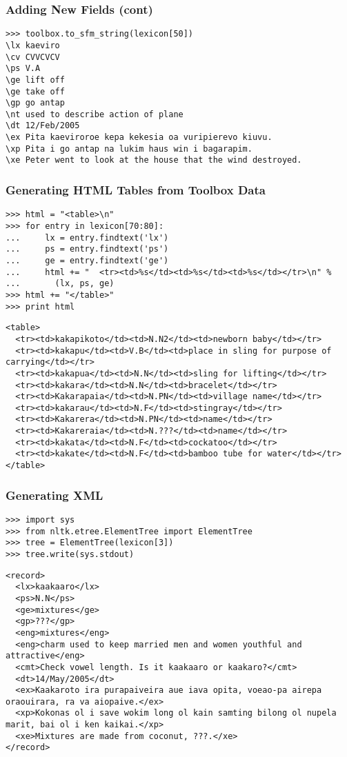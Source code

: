 \documentclass{beamer}             %
\begin{document}
\begin{frame}[fragile]
\frametitle{Adding New Fields (cont)}
\scriptsize
\begin{verbatim}
>>> toolbox.to_sfm_string(lexicon[50])
\lx kaeviro
\cv CVVCVCV
\ps V.A
\ge lift off
\ge take off
\gp go antap
\nt used to describe action of plane
\dt 12/Feb/2005
\ex Pita kaeviroroe kepa kekesia oa vuripierevo kiuvu.
\xp Pita i go antap na lukim haus win i bagarapim.
\xe Peter went to look at the house that the wind destroyed.
\end{verbatim}
\end{frame}

\begin{frame}[fragile]
\frametitle{Generating HTML Tables from Toolbox Data}

\scriptsize
\begin{verbatim}
>>> html = "<table>\n"
>>> for entry in lexicon[70:80]:
...     lx = entry.findtext('lx')
...     ps = entry.findtext('ps')
...     ge = entry.findtext('ge')
...     html += "  <tr><td>%s</td><td>%s</td><td>%s</td></tr>\n" %
...       (lx, ps, ge)
>>> html += "</table>"
>>> print html
\end{verbatim}

\tiny

\begin{verbatim}
<table>
  <tr><td>kakapikoto</td><td>N.N2</td><td>newborn baby</td></tr>
  <tr><td>kakapu</td><td>V.B</td><td>place in sling for purpose of carrying</td></tr>
  <tr><td>kakapua</td><td>N.N</td><td>sling for lifting</td></tr>
  <tr><td>kakara</td><td>N.N</td><td>bracelet</td></tr>
  <tr><td>Kakarapaia</td><td>N.PN</td><td>village name</td></tr>
  <tr><td>kakarau</td><td>N.F</td><td>stingray</td></tr>
  <tr><td>Kakarera</td><td>N.PN</td><td>name</td></tr>
  <tr><td>Kakareraia</td><td>N.???</td><td>name</td></tr>
  <tr><td>kakata</td><td>N.F</td><td>cockatoo</td></tr>
  <tr><td>kakate</td><td>N.F</td><td>bamboo tube for water</td></tr>
</table>
\end{verbatim}
\end{frame}

\begin{frame}[fragile]
\frametitle{Generating XML}

\small
\begin{verbatim}
>>> import sys
>>> from nltk.etree.ElementTree import ElementTree
>>> tree = ElementTree(lexicon[3])
>>> tree.write(sys.stdout)
\end{verbatim}

\scriptsize
\begin{verbatim}
<record>
  <lx>kaakaaro</lx>
  <ps>N.N</ps>
  <ge>mixtures</ge>
  <gp>???</gp>
  <eng>mixtures</eng>
  <eng>charm used to keep married men and women youthful and attractive</eng>
  <cmt>Check vowel length. Is it kaakaaro or kaakaro?</cmt>
  <dt>14/May/2005</dt>
  <ex>Kaakaroto ira purapaiveira aue iava opita, voeao-pa airepa oraouirara, ra va aiopaive.</ex>
  <xp>Kokonas ol i save wokim long ol kain samting bilong ol nupela marit, bai ol i ken kaikai.</xp>
  <xe>Mixtures are made from coconut, ???.</xe>
</record>
\end{verbatim}
\end{frame}
\end{document}

